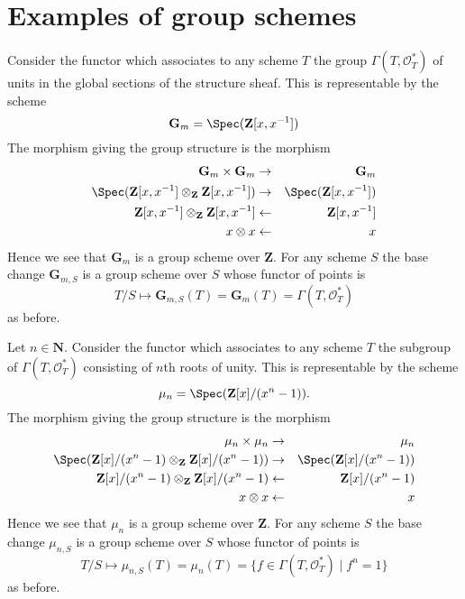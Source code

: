 \section{Examples of group schemes}
\label{section-examples-group-schemes}

\begin{example}
\label{example-multiplicative-group}
Consider the functor which associates
to any scheme $T$ the group $\Gamma(T, \mathcal{O}_T^*)$
of units in the global sections of the structure sheaf.
This is representable by the scheme
$$
\mathbf{G}_m = \Spec(\mathbf{Z}[x, x^{-1}])
$$
The morphism giving the group structure is the morphism
\begin{eqnarray*}
\mathbf{G}_m \times \mathbf{G}_m & \to & \mathbf{G}_m \\
\Spec(\mathbf{Z}[x, x^{-1}] \otimes_{\mathbf{Z}} \mathbf{Z}[x, x^{-1}])
& \to &
\Spec(\mathbf{Z}[x, x^{-1}]) \\
\mathbf{Z}[x, x^{-1}] \otimes_{\mathbf{Z}} \mathbf{Z}[x, x^{-1}]
& \leftarrow &
\mathbf{Z}[x, x^{-1}] \\
x \otimes x & \leftarrow & x
\end{eqnarray*}
Hence we see that $\mathbf{G}_m$ is a group scheme over $\mathbf{Z}$.
For any scheme $S$ the base change $\mathbf{G}_{m, S}$ is a
group scheme over $S$ whose functor of points is
$$
T/S
\longmapsto
\mathbf{G}_{m, S}(T) = \mathbf{G}_m(T) = \Gamma(T, \mathcal{O}_T^*)
$$
as before.
\end{example}

\begin{example}
\label{example-roots-of-unity}
Let $n \in \mathbf{N}$.
Consider the functor which associates
to any scheme $T$ the subgroup of $\Gamma(T, \mathcal{O}_T^*)$
consisting of $n$th roots of unity.
This is representable by the scheme
$$
\mu_n = \Spec(\mathbf{Z}[x]/(x^n - 1)).
$$
The morphism giving the group structure is the morphism
\begin{eqnarray*}
\mu_n \times \mu_n & \to & \mu_n \\
\Spec(
\mathbf{Z}[x]/(x^n - 1)
\otimes_{\mathbf{Z}}
\mathbf{Z}[x]/(x^n - 1))
& \to &
\Spec(\mathbf{Z}[x]/(x^n - 1)) \\
\mathbf{Z}[x]/(x^n - 1) \otimes_{\mathbf{Z}} \mathbf{Z}[x]/(x^n - 1)
& \leftarrow &
\mathbf{Z}[x]/(x^n - 1) \\
x \otimes x & \leftarrow & x
\end{eqnarray*}
Hence we see that $\mu_n$ is a group scheme over $\mathbf{Z}$.
For any scheme $S$ the base change $\mu_{n, S}$ is a
group scheme over $S$ whose functor of points is
$$
T/S
\longmapsto
\mu_{n, S}(T) = \mu_n(T) = \{f \in \Gamma(T, \mathcal{O}_T^*) \mid f^n = 1\}
$$
as before.
\end{example}


